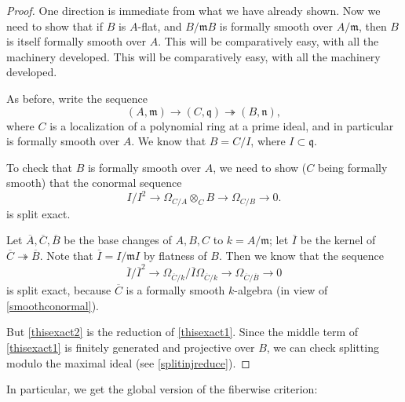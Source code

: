 \begin{proof} 
One direction is immediate from what we have already shown. Now we need to
show that if $B$ is $A$-flat, and $B/\mathfrak{m}B$ is formally smooth over
$A/\mathfrak{m}$, then $B$ is itself formally smooth over $A$.
This will be comparatively easy, with all the machinery developed.
This will be comparatively easy, with all the machinery developed.

As before, write the sequence
\[ (A, \mathfrak{m}) \to (C, \mathfrak{q}) \twoheadrightarrow
(B,\mathfrak{n}),
\]
where $C$ is a localization of a polynomial ring at a prime ideal, and in
particular is formally smooth over $A$. 
We know that $B = C/I$, where $I \subset \mathfrak{q}$.

To check that $B$ is formally smooth over $A$, we need to show ($C$ being
formally smooth) that the conormal sequence
\begin{equation} \label{thisexact1} I/I^2 \to  \Omega_{C/A} \otimes_C B \to
\Omega_{C/B} \to 0. \end{equation}
is split exact. 

Let $\overline{A}, \overline{C}, \overline{B}$ be the base changes of $A, B,
C$ to $k = A/\mathfrak{m}$; let $\overline{I}$ be the kernel of $\overline{C}
\twoheadrightarrow \overline{B}$.
Note that $\overline{I} = I/\mathfrak{m}I$ by flatness of $B$.
Then we know that the sequence
\begin{equation} \label{thisexact2} \overline{I}/\overline{I}^2 \to  \Omega_{\overline{C}/k} / \overline{I}
\Omega_{\overline{C}/k} \to \Omega_{\overline{C}/\overline{B}} \to
0\end{equation}
is split exact, because $\overline{C}$ is a formally smooth $k$-algebra (in
view of \cref{smoothconormal}).

But \eqref{thisexact2} is the reduction of \eqref{thisexact1}. Since the middle
term of \eqref{thisexact1} is finitely generated and projective over $B$, we can check
splitting modulo the maximal ideal (see \cref{splitinjreduce}).
\end{proof} 

In particular, we get the global version of the fiberwise criterion:

